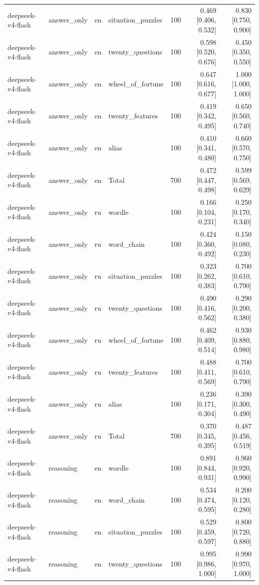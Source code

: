 \begin{longtable}{llllrrr}
deepseek-v4-flash & answer\_only & en & situation\_puzzles & 100 & 0.469 [0.406, 0.532] & 0.830 [0.750, 0.900] \\
deepseek-v4-flash & answer\_only & en & twenty\_questions & 100 & 0.598 [0.520, 0.676] & 0.450 [0.350, 0.550] \\
deepseek-v4-flash & answer\_only & en & wheel\_of\_fortune & 100 & 0.647 [0.616, 0.677] & 1.000 [1.000, 1.000] \\
deepseek-v4-flash & answer\_only & en & twenty\_features & 100 & 0.419 [0.342, 0.495] & 0.650 [0.560, 0.740] \\
deepseek-v4-flash & answer\_only & en & alias & 100 & 0.410 [0.341, 0.480] & 0.660 [0.570, 0.750] \\
deepseek-v4-flash & answer\_only & en & Total & 700 & 0.472 [0.447, 0.498] & 0.599 [0.569, 0.629] \\
deepseek-v4-flash & answer\_only & ru & wordle & 100 & 0.166 [0.104, 0.231] & 0.250 [0.170, 0.340] \\
deepseek-v4-flash & answer\_only & ru & word\_chain & 100 & 0.424 [0.360, 0.492] & 0.150 [0.080, 0.230] \\
deepseek-v4-flash & answer\_only & ru & situation\_puzzles & 100 & 0.323 [0.262, 0.383] & 0.700 [0.610, 0.790] \\
deepseek-v4-flash & answer\_only & ru & twenty\_questions & 100 & 0.490 [0.416, 0.562] & 0.290 [0.200, 0.380] \\
deepseek-v4-flash & answer\_only & ru & wheel\_of\_fortune & 100 & 0.462 [0.409, 0.514] & 0.930 [0.880, 0.980] \\
deepseek-v4-flash & answer\_only & ru & twenty\_features & 100 & 0.488 [0.411, 0.569] & 0.700 [0.610, 0.790] \\
deepseek-v4-flash & answer\_only & ru & alias & 100 & 0.236 [0.171, 0.304] & 0.390 [0.300, 0.490] \\
deepseek-v4-flash & answer\_only & ru & Total & 700 & 0.370 [0.345, 0.395] & 0.487 [0.456, 0.519] \\
deepseek-v4-flash & reasoning & en & wordle & 100 & 0.891 [0.844, 0.931] & 0.960 [0.920, 0.990] \\
deepseek-v4-flash & reasoning & en & word\_chain & 100 & 0.534 [0.474, 0.595] & 0.200 [0.120, 0.280] \\
deepseek-v4-flash & reasoning & en & situation\_puzzles & 100 & 0.529 [0.459, 0.597] & 0.800 [0.720, 0.880] \\
deepseek-v4-flash & reasoning & en & twenty\_questions & 100 & 0.995 [0.986, 1.000] & 0.990 [0.970, 1.000] \\

\end{longtable}
